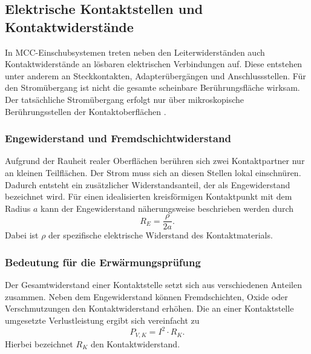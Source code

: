 \subsection{Elektrische Kontaktstellen und Kontaktwiderstände}
\label{sec:kontaktstellen}

In MCC-Einschubsystemen treten neben den Leiterwiderständen auch Kontaktwiderstände an lösbaren elektrischen Verbindungen auf. Diese entstehen unter anderem an Steckkontakten, Adapterübergängen und Anschlussstellen. Für den Stromübergang ist nicht die gesamte scheinbare Berührungsfläche wirksam. Der tatsächliche Stromübergang erfolgt nur über mikroskopische Berührungsstellen der Kontaktoberflächen \cite{Vinaricky_Kontakte}.

\subsubsection{Engewiderstand und Fremdschichtwiderstand}
\label{sec:enge_und_fremdschichtwiderstand}


Aufgrund der Rauheit realer Oberflächen berühren sich zwei Kontaktpartner nur an kleinen Teilflächen. Der Strom muss sich an diesen Stellen lokal einschnüren. Dadurch entsteht ein zusätzlicher Widerstandsanteil, der als Engewiderstand bezeichnet wird. Für einen idealisierten kreisförmigen Kontaktpunkt mit dem Radius $a$ kann der Engewiderstand näherungsweise beschrieben werden durch
\begin{equation}
    R_E = \frac{\rho}{2a}.
    \label{eq:engewiderstand}
\end{equation}
Dabei ist $\rho$ der spezifische elektrische Widerstand des Kontaktmaterials.

\subsubsection{Bedeutung für die Erwärmungsprüfung}
\label{sec:kontakt_bedeutung_erwaermung}

Der Gesamtwiderstand einer Kontaktstelle setzt sich aus verschiedenen Anteilen zusammen. Neben dem Engewiderstand können Fremdschichten, Oxide oder Verschmutzungen den Kontaktwiderstand erhöhen. Die an einer Kontaktstelle umgesetzte Verlustleistung ergibt sich vereinfacht zu
\begin{equation}
    P_{V,K} = I^2 \cdot R_K .
    \label{eq:verlustleistung_kontakt}
\end{equation}
Hierbei bezeichnet $R_K$ den Kontaktwiderstand.

